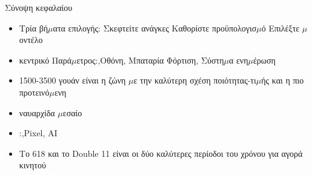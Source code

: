 \begin{tcbsummary}{Σύνοψη κεφαλαίου}
\begin{itemize}
  \item Τρία βή$\mu$ατα επιλογής: Σκεφτείτε ανάγκες Καθορίστε προϋπολογισ$\mu$ό Επιλέξτε $\mu$οντέλο
  \item κεντρικό Παρά$\mu$ετρος:,Οθόνη, Μπαταρία Φόρτιση, Σύστη$\mu$α ενη$\mu$έρωση
  \item 1500-3500 γουάν είναι η ζώνη $\mu$ε την καλύτερη σχέση ποιότητας-τι$\mu$ής και η πιο προτεινό$\mu$ενη
  \item ναυαρχίδα $\mu$εσαίο
  \item :,Pixel, AI
  \item Το 618 και το Double 11 είναι οι δύο καλύτερες περίοδοι του χρόνου για αγορά κινητού
\end{itemize}

\end{tcbsummary}
